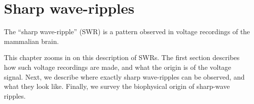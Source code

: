 
\chapter{Sharp wave-ripples}
\label{sec:swr}


The ``sharp wave-ripple'' (SWR) is a pattern observed in voltage recordings of the mammalian brain.

This chapter zooms in on this description of SWRs. The first section describes how such voltage recordings are made, and what the origin is of the voltage signal. Next, we describe where exactly sharp wave-ripples can be observed, and what they look like. Finally, we survey the biophysical origin of sharp-wave ripples.



